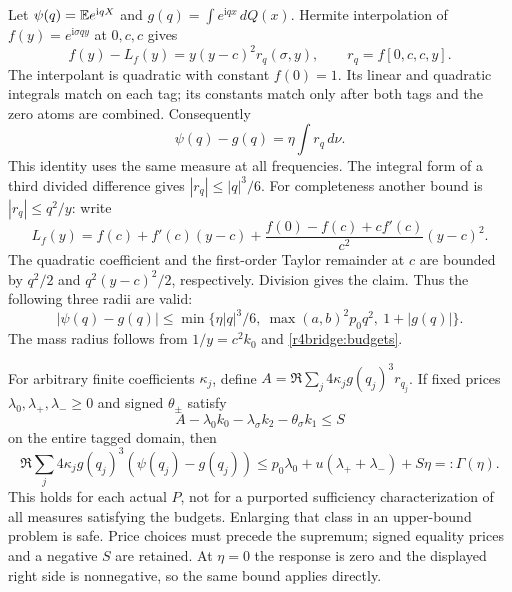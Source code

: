 Let $\psi(q)=\mathbb E e^{\mathrm iqX}$ and $g(q)=\int e^{\mathrm iqx}\,dQ(x)$.
Hermite interpolation of $f(y)=e^{\mathrm i\sigma qy}$ at $0,c,c$ gives
\[
 f(y)-L_f(y)=y(y-c)^2 r_q(\sigma,y),\qquad
 r_q=f[0,c,c,y].
\]
The interpolant is quadratic with constant $f(0)=1$. Its linear and
quadratic integrals match on each tag; its constants match only after
both tags and the zero atoms are combined. Consequently
\begin{equation}
 \psi(q)-g(q)=\eta\int r_q\,d\nu.\label{r4bridge:response}
\end{equation}
This identity uses the same measure at all frequencies. The integral
form of a third divided difference gives $|r_q|\le |q|^3/6$.
For completeness another bound is $|r_q|\le q^2/y$: write
\[
 L_f(y)=f(c)+f'(c)(y-c)
       +\frac{f(0)-f(c)+cf'(c)}{c^2}(y-c)^2.
\]
The quadratic coefficient and the first-order Taylor remainder at $c$
are bounded by $q^2/2$ and $q^2(y-c)^2/2$, respectively. Division
gives the claim. Thus the following three radii are valid:
\begin{equation}
 |\psi(q)-g(q)|\le
 \min\{\eta|q|^3/6,\ \max(a,b)^2p_0q^2,\ 1+|g(q)|\}.
 \label{r4bridge:radii}
\end{equation}
The mass radius follows from $1/y=c^2k_0$ and \eqref{r4bridge:budgets}.

For arbitrary finite coefficients $\kappa_j$, define
$A=\Re\sum_j4\kappa_jg(q_j)^3r_{q_j}$. If fixed prices
$\lambda_0,\lambda_+,\lambda_-\ge0$ and signed $\theta_\pm$ satisfy
\[
 A-\lambda_0k_0-\lambda_\sigma k_2-\theta_\sigma k_1\le S
\]
on the entire tagged domain, then
\begin{equation}
 \Re\sum_j4\kappa_jg(q_j)^3(\psi(q_j)-g(q_j))
 \le p_0\lambda_0+u(\lambda_++\lambda_-)+S\eta=:\Gamma(\eta).
 \label{r4bridge:price}
\end{equation}
This holds for each actual $P$, not for a purported sufficiency
characterization of all measures satisfying the budgets. Enlarging
that class in an upper-bound problem is safe. Price choices must precede
the supremum; signed equality prices and a negative $S$ are retained.
At $\eta=0$ the response is zero and the displayed right side is
nonnegative, so the same bound applies directly.

